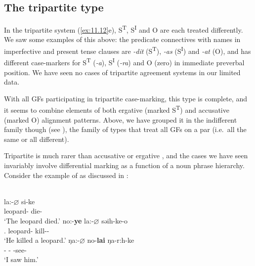 \documentclass[output=paper]{langsci/langscibook}
\begin{document}
\subsection{The tripartite type}\label{sec:11.5.3}

In the tripartite system (\ref{ex:11.12}e), S\textsuperscript{T}, S\textsuperscript{I} and
O are each treated differently. We saw some examples of this above: the
predicate connectives with names in  imperfective and present
tense clauses are \emph{-dit} (S\textsuperscript{T}), \emph{-as}
(S\textsuperscript{I}) and \emph{-at} (O), and  has different
case-markers for S\textsuperscript{T} (\emph{-a}), S\textsuperscript{I}
(\emph{-ra}) and O (zero) in immediate preverbal position. We have seen no
cases of tripartite agreement systems in our limited data.

With all \glspl{GF} participating in tripartite
case-marking, this  type is complete, and it seems to combine elements
of both ergative (marked S\textsuperscript{T}) and accusative (marked O)
alignment patterns.  Above, we have grouped it in the indifferent family though
(see ), the family of  types that treat all
\glspl{GF} on a par (i.e.\ all the same or all
different).

\begin{sloppypar}
Tripartite  is much rarer than accusative or ergative 
\citep[40]{Dixon1994}, and the cases we have seen invariably involve
differential marking as a function of a noun phrase  hierarchy. Consider
the example of  as discussed in \textcite{Watters2002}:
\end{sloppypar}

\ea%
\label{ex:11.17}  \parencite[66--67]{Watters2002}\\
	\ea
		\gll la:-${\varnothing}$        si-ke\\
			leopard-\Abs{}  die-\Pfv{}\\
		\glt ‘The leopard died.’
	\ex
		\gll no:-\textbf{ye}    la:-${\varnothing}$        səih-ke-o\\
			\Tsg.\Erg{}  leopard-\Abs{}  kill-\Pfv{}-\Tsg{}\\
		\glt ‘He killed a leopard.’
	\ex
		\gll ŋa:-${\varnothing}$    no-\textbf{lai}    ŋa-r:h-ke\\
			\Fsg-\Nom{} \Tsg-\Acc{} \Fsg{}-see-\Pfv{}\\
		\glt ‘I saw him.’
	\z
\z
\end{document}
